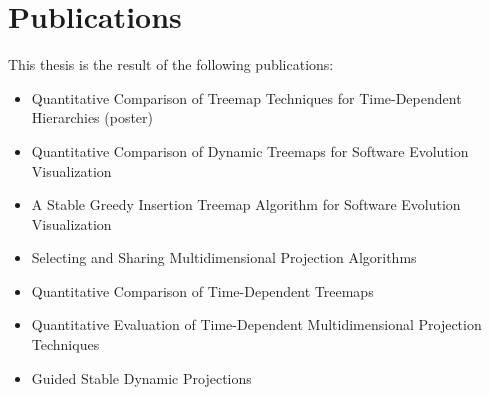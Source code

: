 \begingroup
\let\clearpage\relax
\let\cleardoublepage\relax
\let\cleardoublepage\relax

\manualmark
{} 

\chapter*{Publications}
This thesis is the result of the following publications:
\begin{itemize}
\item Quantitative Comparison of Treemap Techniques for Time-Dependent Hierarchies (poster) ~\citep{vernier17}
\item Quantitative Comparison of Dynamic Treemaps for Software Evolution Visualization~\citep{vernier18software}
\item A Stable Greedy Insertion Treemap Algorithm for Software Evolution Visualization~\citep{vernier18git}
\item Selecting and Sharing Multidimensional Projection Algorithms~\citep{EspadotoSharing}
\item Quantitative Comparison of Time-Dependent Treemaps~\citep{vernier_treemap}
\item Quantitative Evaluation of Time-Dependent Multidimensional Projection Techniques~\citep{Vernier2020}
\item Guided Stable Dynamic Projections~\citep{Vernier2021}
\end{itemize}


\endgroup
